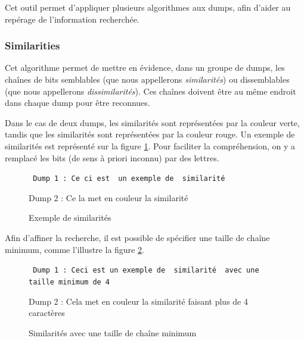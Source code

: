 Cet outil permet d'appliquer plusieurs algorithmes aux dumps, afin d'aider au repérage de l'information recherchée.

\subsubsection{Similarities \cite {ref-vandeursen}} \label{04-similarities}

Cet algorithme permet de mettre en évidence, dans un groupe de dumps, les chaînes de bits semblables (que nous appellerons \emph{similarités}) ou dissemblables (que nous appellerons \emph{dissimilarités}). Ces chaînes doivent être au même endroit dans chaque dump pour être reconnues.

Dans le cas de deux dumps, les similarités sont représentées par la couleur verte, tandis que les similarités sont représentées par la couleur rouge. Un exemple de similarités est représenté sur la figure \ref{04-1-sim_simple}. Pour faciliter la compréhension, on y a remplacé les bits (de sens à priori inconnu) par des lettres.

\begin{figure}[!h]
  \begin{center}
\small{
  {\tt\center
  {Dump 1 : \color{simColor} Ce}{\color{dissimColor} ci es}{\color{simColor}t }{\color{dissimColor} un exemple de }{\color{simColor} similarité}

  {Dump 2 : \color{simColor} Ce}{\color{dissimColor} la me}{\color{simColor}t }{\color{dissimColor} en couleur la }{\color{simColor} similarité}
  }}
  \end{center}
  \caption{Exemple de similarités}
  \label{04-1-sim_simple}
\end{figure}

Afin d'affiner la recherche, il est possible de spécifier une taille de chaîne minimum, comme l'illustre la figure \ref{04-1-sim_taille_min}.

\begin{figure}[!h]
  \begin{center}
\small{
  {\tt
  {Dump 1 : \color{dissimColor} Ceci est un exemple de }{\color{simColor} similarité }{\color{dissimColor} avec une taille minimum de 4}

  {Dump 2 : \color{dissimColor} Cela met en couleur la }{\color{simColor} similarité }{\color{dissimColor} faisant plus de 4 caractères}
  }}
  \end{center}
  \caption{Similarités avec une taille de chaîne minimum}
  \label{04-1-sim_taille_min}
\end{figure}


